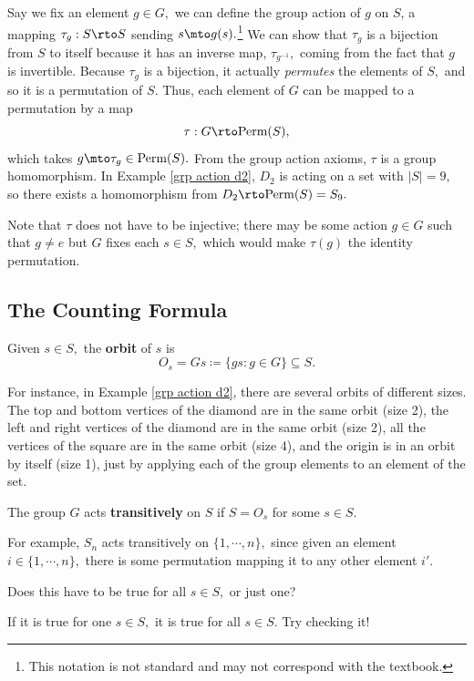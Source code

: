Say we fix an element $g \in G,$ we can define the group action of $g$ on $S$, a mapping $\tau_g: S \rto S$ sending $s \mto g(s).$\footnote{This notation is not standard and may not correspond with the textbook.} We can show that $\tau_g$ is a bijection from $S$ to itself because it has an inverse map, $\tau_{g^{-1}},$ coming from the fact that $g$ is invertible. Because $\tau_g$ is a bijection, it actually \emph{permutes} the elements of $S,$ and so it is a permutation of $S.$ Thus, each element of $G$ can be mapped to a permutation by a map
\[
\tau: G \rto \text{Perm}(S),
\]
which takes $g \mto \tau_g \in \text{Perm}(S).$ From the group action axioms, $\tau$ is a group homomorphism. In Example \ref{grp action d2}, $D_2$ is acting on a set with $|S| = 9,$ so there exists a homomorphism from $D_2 \rto \text{Perm}(S) = S_9.$

Note that $\tau$ does not have to be injective; there may be some action $g \in G$ such that $g \neq e$ but $G$ fixes each $s \in S,$ which would make $\tau(g)$ the identity permutation.

\subsection{The Counting Formula}

\begin{definition}
Given $s \in S,$ the \textbf{orbit} of $s$ is 
\[
O_s = Gs \coloneqq \{gs : g \in G\} \subseteq S.
\]
\end{definition}

For instance, in Example \ref{grp action d2}, there are several orbits of different sizes. The top and bottom vertices of the diamond are in the same orbit (size 2), the left and right vertices of the diamond are in the same orbit (size 2), all the vertices of the square are in the same orbit (size 4), and the origin is in an orbit by itself (size 1), just by applying each of the group elements to an element of the set.  


\begin{definition}
The group $G$ acts \textbf{transitively} on $S$ if $S = O_s$ for some $s \in S.$ 
\end{definition}

For example, $S_n$ acts transitively on $\{1, \cdots, n\},$ since given an element $i \in \{1, \cdots, n\},$ there is some permutation mapping it to any other element $i'.$

\begin{question}
Does this have to be true for all $s \in S,$ or just one?
\end{question}
\begin{ans}
If it is true for one $s \in S,$ it is true for all $s \in S.$ Try checking it!
\end{ans}


